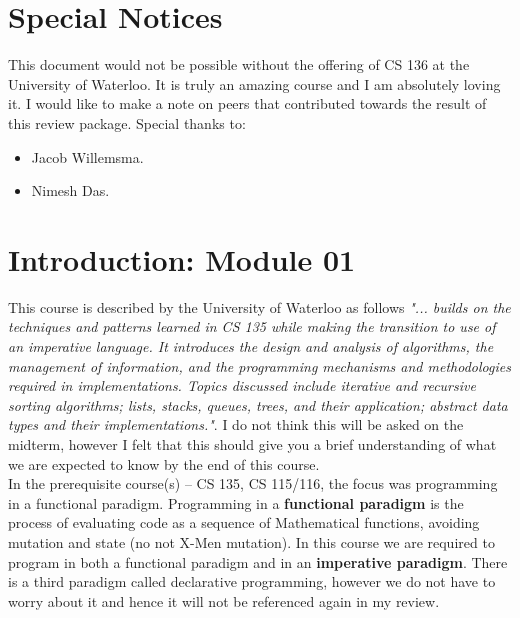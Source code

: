 \documentclass[12pt,extarticle]{article}
\begin{document}
\section*{Special Notices}

This document would not be possible without the offering of CS 136 at the University of Waterloo. It is truly an amazing course and I am absolutely loving it. I would like to make a note on peers that contributed towards the result of this review package. Special thanks to:\\

\begin{itemize}

\item Jacob Willemsma.
\item Nimesh Das.

\end{itemize}

\newpage
\thispagestyle{empty}
\tableofcontents

\newpage
\section{Introduction: Module 01}

This course is described by the University of Waterloo as follows \emph{"... builds on the techniques and patterns learned in CS 135 while making the transition to use of an imperative language. It introduces the design and analysis of algorithms, the management of information, and the programming mechanisms and methodologies required in implementations. Topics discussed include iterative and recursive sorting algorithms; lists, stacks, queues, trees, and their application; abstract data types and their implementations."}. I do not think this will be asked on the midterm, however I felt that this should give you a brief understanding of what we are expected to know by the end of this course.\\

In the prerequisite course(s) -- CS 135, CS 115/116, the focus was programming in a functional paradigm. Programming in a \textbf{functional paradigm} is the process of evaluating code as a sequence of Mathematical functions, avoiding mutation and state (no not X-Men mutation). In this course we are required to program in both a functional paradigm and in an \textbf{imperative paradigm}. There is a third paradigm called declarative programming, however we do not have to worry about it and hence it will not be referenced again in my review.\\
\end{document}

